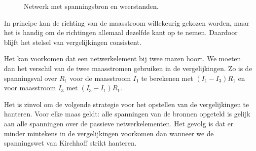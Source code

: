 \begin{figure}[!ht]
\centering
{}
\caption{Netwerk met spanningsbron en weerstanden.}
\label{fig:gelnetwerkvoormeshanalysis}
\end{figure}

In principe kan de richting van de maasstroom willekeurig gekozen worden, maar het is handig om de richtingen allemaal dezelfde kant op te nemen. Daardoor blijft het stelsel van vergelijkingen consistent.

Het kan voorkomen dat een netwerkelement bij twee mazen hoort. We moeten dan het verschil van de twee maasstromen gebruiken in de vergelijkingen. Zo is de spanningsval over $R_1$ voor de maasstroom $I_1$ te berekenen met $(I_1-I_3)R_1$ en voor maasstroom $I_3$ met $(I_3-I_1)R_1$.

Het is zinvol om de volgende strategie voor het opstellen van de vergelijkingen te hanteren. Voor elke maas geldt: alle spanningen van de bronnen opgeteld is gelijk aan alle spanningen over de passieve netwerkelementen. Het gevolg is dat er minder mintekens in de vergelijkingen voorkomen dan wanneer we de spanningswet van Kirchhoff strikt hanteren.

